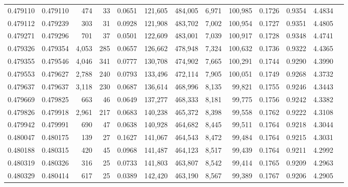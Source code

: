 \begin{tabular}{rrrrrrrrrrrrr}
0.479110 & 0.479110 &   474 &    33 &                                     0.0651 & 121,605 & 484,005 &   6,971 & 100,985 & 0.1726 & 0.9354 & 4.4834 \\
0.479112 & 0.479239 &   303 &    31 &                                     0.0928 & 121,908 & 483,702 &   7,002 & 100,954 & 0.1727 & 0.9351 & 4.4805 \\
0.479271 & 0.479296 &   701 &    37 &                                     0.0501 & 122,609 & 483,001 &   7,039 & 100,917 & 0.1728 & 0.9348 & 4.4741 \\
0.479326 & 0.479354 & 4,053 &   285 &                                     0.0657 & 126,662 & 478,948 &   7,324 & 100,632 & 0.1736 & 0.9322 & 4.4365 \\
0.479355 & 0.479546 & 4,046 &   341 &                                     0.0777 & 130,708 & 474,902 &   7,665 & 100,291 & 0.1744 & 0.9290 & 4.3990 \\
0.479553 & 0.479627 & 2,788 &   240 &                                     0.0793 & 133,496 & 472,114 &   7,905 & 100,051 & 0.1749 & 0.9268 & 4.3732 \\
0.479637 & 0.479637 & 3,118 &   230 &                                     0.0687 & 136,614 & 468,996 &   8,135 &  99,821 & 0.1755 & 0.9246 & 4.3443 \\
0.479669 & 0.479825 &   663 &    46 &                                     0.0649 & 137,277 & 468,333 &   8,181 &  99,775 & 0.1756 & 0.9242 & 4.3382 \\
0.479826 & 0.479918 & 2,961 &   217 &                                     0.0683 & 140,238 & 465,372 &   8,398 &  99,558 & 0.1762 & 0.9222 & 4.3108 \\
0.479942 & 0.479991 &   690 &    47 &                                     0.0638 & 140,928 & 464,682 &   8,445 &  99,511 & 0.1764 & 0.9218 & 4.3044 \\
0.480047 & 0.480175 &   139 &    27 &                                     0.1627 & 141,067 & 464,543 &   8,472 &  99,484 & 0.1764 & 0.9215 & 4.3031 \\
0.480188 & 0.480315 &   420 &    45 &                                     0.0968 & 141,487 & 464,123 &   8,517 &  99,439 & 0.1764 & 0.9211 & 4.2992 \\
0.480319 & 0.480326 &   316 &    25 &                                     0.0733 & 141,803 & 463,807 &   8,542 &  99,414 & 0.1765 & 0.9209 & 4.2963 \\
0.480329 & 0.480414 &   617 &    25 &                                     0.0389 & 142,420 & 463,190 &   8,567 &  99,389 & 0.1767 & 0.9206 & 4.2905 \\

\end{tabular}
